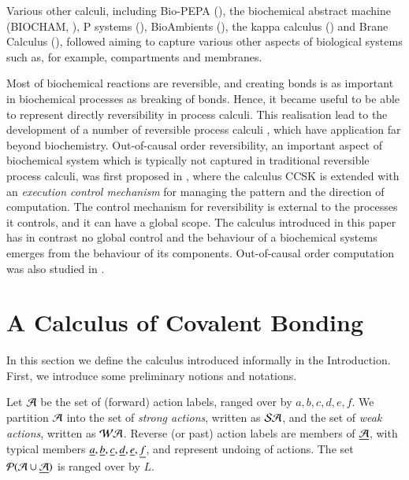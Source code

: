 Various other calculi, including  Bio-PEPA (\cite{CiocchettaBiopepa}), the biochemical abstract 
machine (BIOCHAM, \cite{biocham}), P systems (\cite{psystems}), BioAmbients (\cite{RegevBioambients}), 
the kappa calculus (\cite{danos2004kappa}) and Brane Calculus (\cite{CardelliBraneCalculi}),
followed aiming to capture various other aspects of biological systems such as,
for example, compartments and  membranes.

Most of biochemical reactions are reversible, and creating bonds is as important in biochemical processes
as breaking of bonds. Hence, it became useful to be able to represent directly reversibility in
process calculi. This realisation lead to the development of a number of reversible
process calculi \cite{danos2004ccsr,Danos2007ccsr,PhillipsUlidowski06,Irek2007,LaneseMS10,Lanese_controllingreversibility,Lanese_controlled,CKV13}, which have application far beyond biochemistry.
Out-of-causal order reversibility, an important aspect of biochemical system which is
typically not captured in traditional reversible process calculi, was first proposed 
in \cite{Irek2012}, where the calculus CCSK 
\cite{Irek2007} is extended with an \emph{execution control mechanism} for 
managing the pattern and the direction of computation. The control mechanism for reversibility
is external to the processes it controls, and it can have a global scope. The calculus introduced 
in this paper has in contrast  no global control and the behaviour
of a biochemical systems emerges from the behaviour of its components. Out-of-causal order computation
was also studied in \cite{Irek2013,irekconcur2013}.

\section{A Calculus of Covalent Bonding}\label{sec:calculus}

In this section we define the calculus introduced informally in the Introduction. 
First, we introduce some preliminary notions and notations.

Let $\mathcal{A}$ be the set of (forward) action labels, 
ranged over by $a,b,c,d,e,f$. We partition $\mathcal{A}$ into the set of \emph{strong actions}, written as
$\mathcal{SA}$, and the set of \emph{weak actions}, written as $\mathcal{WA}$. Reverse (or past) action labels are members of
$\underline{\mathcal{A}}$, with typical members $\underline {a},\underline {b}, \underline {c},\underline {d}, \underline {e} ,\underline {f}$, and represent 
undoing of actions. The set $\mathcal{P}(\mathcal{A} \cup \underline{\mathcal{A}})$ is ranged over by $L$.

